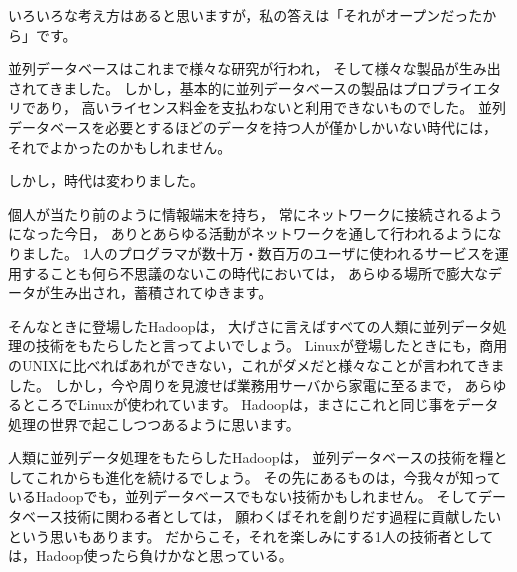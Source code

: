 いろいろな考え方はあると思いますが，私の答えは「それがオープンだったから」です。

並列データベースはこれまで様々な研究が行われ，
そして様々な製品が生み出されてきました。
しかし，基本的に並列データベースの製品はプロプライエタリであり，
高いライセンス料金を支払わないと利用できないものでした。
並列データベースを必要とするほどのデータを持つ人が僅かしかいない時代には，
それでよかったのかもしれません。

しかし，時代は変わりました。

個人が当たり前のように情報端末を持ち，
常にネットワークに接続されるようになった今日，
ありとあらゆる活動がネットワークを通して行われるようになりました。
1人のプログラマが数十万・数百万のユーザに使われるサービスを運用することも何ら不思議のないこの時代においては，
あらゆる場所で膨大なデータが生み出され，蓄積されてゆきます。

そんなときに登場したHadoopは，
大げさに言えばすべての人類に並列データ処理の技術をもたらしたと言ってよいでしょう。
Linuxが登場したときにも，商用のUNIXに比べればあれができない，これがダメだと様々なことが言われてきました。
しかし，今や周りを見渡せば業務用サーバから家電に至るまで，
あらゆるところでLinuxが使われています。
Hadoopは，まさにこれと同じ事をデータ処理の世界で起こしつつあるように思います。

人類に並列データ処理をもたらしたHadoopは，
並列データベースの技術を糧としてこれからも進化を続けるでしょう。
その先にあるものは，今我々が知っているHadoopでも，並列データベースでもない技術かもしれません。
そしてデータベース技術に関わる者としては，
願わくばそれを創りだす過程に貢献したいという思いもあります。
だからこそ，それを楽しみにする1人の技術者としては，Hadoop使ったら負けかなと思っている。

